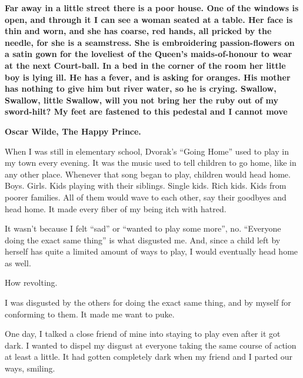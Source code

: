 
\begin{center}
\begin{tcolorbox}[width=0.75\textwidth,colback=darkgray,colupper=white]
\textbf{Far away in a little street there is a poor house.  One of the windows is open, and through it I can see a woman seated at a table.  Her face is thin and worn, and she has coarse, red hands, all pricked by the needle, for she is a seamstress.  She is embroidering passion-flowers on a satin gown for the loveliest of the Queen's maids-of-honour to wear at the next Court-ball.  In a bed in the corner of the room her little boy is lying ill.  He has a fever, and is asking for oranges.  His mother has nothing to give him but river water, so he is crying.  Swallow, Swallow, little Swallow, will you not bring her the ruby out of my sword-hilt?  My feet are fastened to this pedestal and I cannot move}

\bigskip

\textbf{Oscar Wilde, The Happy Prince.}
\end{tcolorbox}
\end{center}

When I was still in elementary school, Dvorak's ``Going Home'' used to play in my town every evening. It was the music used to tell children to go home, like in any other place. Whenever that song began to play, children would head home. Boys. Girls. Kids playing with their siblings. Single kids. Rich kids. Kids from poorer families. All of them would wave to each other, say their goodbyes and head home. It made every fiber of my being itch with hatred.

It wasn't because I felt ``sad'' or ``wanted to play some more'', no. ``Everyone doing the exact same thing'' is what disgusted me. And, since a child left by herself has quite a limited amount of ways to play, I would eventually head home as well.

How revolting.

I was disgusted by the others for doing the exact same thing, and by myself for conforming to them. It made me want to puke.

One day, I talked a close friend of mine into staying to play even after it got dark. I wanted to dispel my disgust at everyone taking the same course of action at least a little. It had gotten completely dark when my friend and I parted our ways, smiling.

